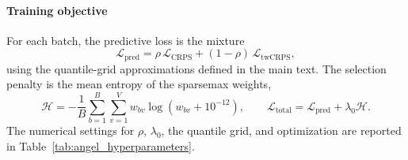 \documentclass[a4paper,fleqn]{cas-sc}
\begin{document}
\paragraph{Training objective}
For each batch, the predictive loss is the mixture
\begin{equation}
  \mathcal{L}_{\mathrm{pred}}
  = \rho\,\mathcal{L}_{\mathrm{CRPS}}
    +(1-\rho)\,\mathcal{L}_{\mathrm{twCRPS}},
\end{equation}
using the quantile-grid approximations defined in the main text. The
selection penalty is the mean entropy of the sparsemax weights,
\begin{equation}
  \mathcal{H}
  =-\frac{1}{B}\sum_{b=1}^{B}\sum_{v=1}^{V}
       w_{bv}\log(w_{bv}+10^{-12}),
  \qquad
  \mathcal{L}_{\mathrm{total}}
  =\mathcal{L}_{\mathrm{pred}}+\lambda_0\mathcal{H}.
\end{equation}
The numerical settings for $\rho$, $\lambda_0$, the quantile grid, and
optimization are reported in Table~\ref{tab:angel_hyperparameters}.
\end{document}
